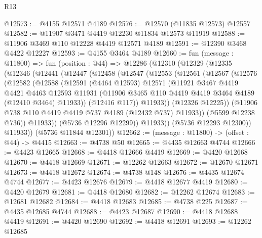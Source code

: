 \begin{lexlean}{R13}
\begin{coremodule}
@12573 := @4155 @12571 @4189
@12576 := @12570 (@11835 @12573) @12557
@12582 := @11907 @3471 @4419 @12230 @11834 @12573 @11919
@12588 := @11906 @3469 @110 @12228 @4419 @12571 @4189
@12591 := @12390 @3468 @4422 @12227
@12593 := @4155 @3464 @4189
@12660 := fun (message : @11800) =>
  fun (position : @44) =>
  @12286
    (@12310
      (@12329
        (@12335
          (@12346
            (@12441
              (@12447
                (@12458
                  (@12547
                    (@12553
                      (@12561
                        (@12567
                          (@12576
                            (@12582
                              (@12588
                                (@12591
                                  (@4464 @12593)
                                  @12571
                                  (@11921
                                    @3467
                                    @4419
                                    @4421
                                    @4463
                                    @12593
                                    @11931
                                    (@11906
                                      @3465
                                      @110
                                      @4419
                                      @4419
                                      @3464
                                      @4189
                                      (@12410 @3464)
                                      @11933))
                                  (@12416 @117))
                                @11933))
                            (@12326 @12225))
                          (@11906 @738 @110 @4419 @4419 @737 @4189 (@12432 @737) @11933))
                        (@5599 @12238 @736))
                      @11933))
                  (@5736 @12296 @12299))
                @11933))
            (@5736 @12293 @12300))
          @11933))
      (@5736 @11844 @12301))
@12662 := (message : @11800) -> (offset : @44) -> @4415
@12663 := @4738 @50
@12665 := @4435 @12663 @4744
@12666 := @4423 @12665
@12668 := @4418 @12666 @4419
@12669 := @4420 @12668
@12670 := @4418 @12669
@12671 := @12262 @12663
@12672 := @12670 @12671
@12673 := @4418 @12672
@12674 := @4738 @148
@12676 := @4435 @12674 @4744
@12677 := @4423 @12676
@12679 := @4418 @12677 @4419
@12680 := @4420 @12679
@12681 := @4418 @12680
@12682 := @12262 @12674
@12683 := @12681 @12682
@12684 := @4418 @12683
@12685 := @4738 @225
@12687 := @4435 @12685 @4744
@12688 := @4423 @12687
@12690 := @4418 @12688 @4419
@12691 := @4420 @12690
@12692 := @4418 @12691
@12693 := @12262 @12685

\end{coremodule}
\end{lexlean}
